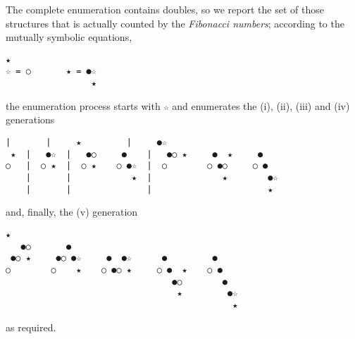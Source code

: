\noindent The complete enumeration contains doubles, so we report the set of those
structures that is actually counted by the \textit{Fibonacci numbers};
according to the mutually symbolic equations,
\begin{Verbatim}[baselinestretch=0.5]
     ★
☆ = ○       ★ = ●☆
                 ★
\end{Verbatim}
the enumeration process starts with \verb|☆| and enumerates the (i), (ii),
(iii) and (iv) generations
\begin{Verbatim}[baselinestretch=0.5]
    |       |     ★         |     ●☆          
 ★  |   ●☆  |   ●○     ●    |   ●○ ★     ●  ★     ● 
○   |  ○ ★  |  ○ ★    ○ ●☆  |  ○        ○ ●○     ○ ●
    |       |            ★  |              ★        ●☆
    |       |               |                       ★
\end{Verbatim}
and, finally, the (v) generation
\begin{Verbatim}[baselinestretch=0.5]
     ★
   ●○       ●              
 ●○ ★     ●○ ●☆     ●  ●☆      ●         ●
○        ○    ★    ○ ●○ ★     ○ ●  ★    ○ ●
                                 ●○        ●
                                  ★         ●☆
                                             ★
\end{Verbatim}
as required.
